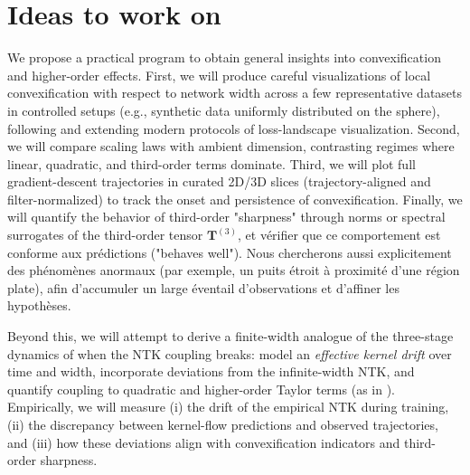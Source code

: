 \documentclass[12pt]{article}
\begin{document}
\section{Ideas to work on}\label{sec:ideas}
We propose a practical program to obtain general insights into convexification and higher-order effects. First, we will produce careful visualizations of local convexification with respect to network width across a few representative datasets in controlled setups (e.g., synthetic data uniformly distributed on the sphere), following and extending modern protocols of loss-landscape visualization. Second, we will compare scaling laws with ambient dimension, contrasting regimes where linear, quadratic, and third-order terms dominate. Third, we will plot full gradient-descent trajectories in curated 2D/3D slices (trajectory-aligned and filter-normalized) to track the onset and persistence of convexification. Finally, we will quantify the behavior of third-order "sharpness" through norms or spectral surrogates of the third-order tensor \(\bm{T}^{(3)}\), et vérifier que ce comportement est conforme aux prédictions ("behaves well"). Nous chercherons aussi explicitement des phénomènes anormaux (par exemple, un puits étroit à proximité d'une région plate), afin d'accumuler un large éventail d'observations et d'affiner les hypothèses.

Beyond this, we will attempt to derive a finite-width analogue of the three-stage dynamics of \cite{ghosh2021stageslearningdynamicshighdimensional} when the NTK coupling breaks: model an \emph{effective kernel drift} over time and width, incorporate deviations from the infinite-width NTK, and quantify coupling to quadratic and higher-order Taylor terms (as in \cite{bai2020beyond}). Empirically, we will measure (i) the drift of the empirical NTK during training, (ii) the discrepancy between kernel-flow predictions and observed trajectories, and (iii) how these deviations align with convexification indicators and third-order sharpness.
\end{document}
